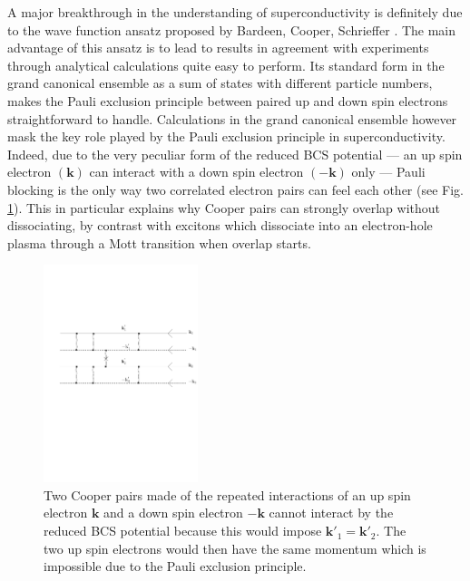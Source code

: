 \documentclass[twocolumn,showpacs]{revtex4}
\def\v#1{\mathbf{#1}}
\begin{document}
A major breakthrough in the understanding of superconductivity is definitely due to the wave function ansatz proposed by Bardeen, Cooper, Schrieffer \cite{BCS}. The main advantage of this ansatz is to lead to results in agreement with experiments through analytical calculations quite easy to perform. Its standard form in the grand canonical ensemble as a sum of  states with different particle numbers, makes the Pauli exclusion principle between paired up and down spin electrons straightforward to handle. Calculations in the grand canonical ensemble however mask the key role played by the Pauli exclusion principle in superconductivity. Indeed, due to the very peculiar form of the reduced BCS potential --- an up spin electron $(\v k)$ can interact with a down spin electron $(-\v k)$ only --- Pauli blocking is the only way two correlated electron pairs can feel each other (see Fig. \ref{fig:shiva}). This in particular explains why Cooper pairs can strongly overlap without dissociating, by contrast with excitons which dissociate into an electron-hole plasma through a Mott transition when overlap starts.
\begin{figure}[htbp]
\begin{center}
\includegraphics[width=0.4\textwidth]{shiva}
\caption{Two Cooper pairs made of the repeated interactions of an up spin electron $\v k$ and a down spin electron $-\v{k}$ cannot interact by the reduced BCS potential because this would impose $\v{k}'_1=\v{k}'_2$.  The two up spin electrons would then have the same momentum which is impossible due to the Pauli exclusion principle. \label{fig:shiva}} 

\end{center}
\end{figure}
\end{document}
